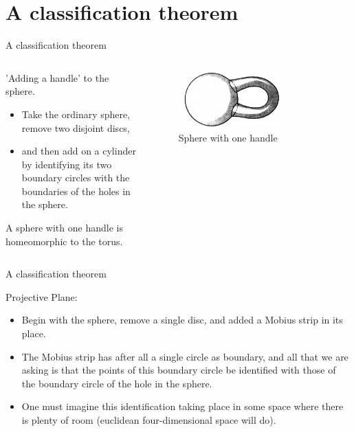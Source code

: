 \documentclass{beamer}
\begin{document}
\section{A classification theorem}

\begin{frame}{A classification theorem}
  \begin{columns}
    \begin{column}{0.6\textwidth}
      \begin{block}{}
        'Adding a handle' to the sphere.
        \begin{itemize}
        \item Take the ordinary sphere, remove two disjoint discs,
        \item and then add on a cylinder by identifying its two boundary circles with the boundaries of the holes in the sphere.
        \end{itemize}
      \end{block}
      A sphere with one handle is homeomorphic to the torus.
    \end{column}
    \begin{column}{0.4\textwidth}
      \begin{figure}
        \centering
        \includegraphics[width=0.7\textwidth]{figure_1_17.png}
        \caption{Sphere with one handle}
      \end{figure}
    \end{column}
  \end{columns}
\end{frame}

\begin{frame}{A classification theorem}
  \begin{block}{}
    Projective Plane:
    \begin{itemize}
    \item Begin with the sphere, remove a single disc, and added a Mobius strip in its place.
    \item The Mobius strip has after all a single circle as boundary, and all that we are asking is that the points of this boundary circle be identified with those of the boundary circle of the hole in the sphere.
    \item One must imagine this identification taking place in some space where there is plenty of room (euclidean four-dimensional space will do).
    \end{itemize}
  \end{block}
\end{frame}
\end{document}
